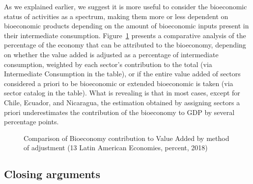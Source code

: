 \documentclass[
  letterpaper,
  DIV=11,
  numbers=noendperiod]{scrartcl}
\begin{document}
As we explained earlier, we suggest it is more useful to consider the
bioeconomic status of activities as a spectrum, making them more or less
dependent on bioeconomic products depending on the amount of bioeconomic
inputs present in their intermediate consumption.
Figure~\ref{fig-latam-value-added-methods} presents a comparative
analysis of the percentage of the economy that can be attributed to the
bioeconomy, depending on whether the value added is adjusted as a
percentage of intermediate consumption, weighted by each sector's
contribution to the total (via Intermediate Consumption in the table),
or if the entire value added of sectors considered a priori to be
bioeconomic or extended bioeconomic is taken (via sector catalog in the
table). What is revealing is that in most cases, except for Chile,
Ecuador, and Nicaragua, the estimation obtained by assigning sectors a
priori underestimates the contribution of the bioeconomy to GDP by
several percentage points.

\begin{figure}


\caption{\label{fig-latam-value-added-methods}Comparison of Bioeconomy
contribution to Value Added by method of adjustment (13 Latin American
Economies, percent, 2018)}

\end{figure}%

\subsection{Closing arguments}\label{closing-arguments}
\end{document}
